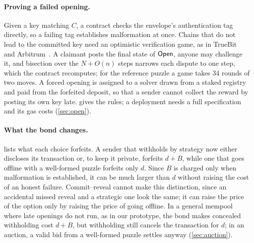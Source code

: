 \paragraph{Proving a failed opening.}
Given a key matching $C$, a contract checks the envelope's authentication tag directly, so a failing tag establishes malformation at once. Chains that do not lead to the committed key need an optimistic verification game, as in TrueBit~\cite{TR17} and Arbitrum~\cite{Arbitrum18}. A claimant posts the final state of $\mathsf{Open}$, anyone may challenge it, and bisection over the $N + O(n)$ steps narrows each dispute to one step, which the contract recomputes; for the reference puzzle a game takes 34 rounds of two moves. A forced opening is assigned to a solver drawn from a staked registry and paid from the forfeited deposit, so that a sender cannot collect the reward by posting its own key late.  gives the rules; a deployment needs a full specification and its gas costs (\cref{sec:open}).

\paragraph{What the bond changes.}
 lists what each choice forfeits. A sender that withholds by strategy now either discloses its transaction or, to keep it private, forfeits $d + B$, while one that goes offline with a well-formed puzzle forfeits only $d$. Since $B$ is charged only when malformation is established, it can be much larger than $d$ without raising the cost of an honest failure. Commit--reveal cannot make this distinction, since an accidental missed reveal and a strategic one look the same; it can raise the price of the option only by raising the price of going offline. In a general mempool where late openings do not run, as in our prototype, the bond makes concealed withholding cost $d + B$, but withholding still cancels the transaction for $d$; in an auction, a valid bid from a well-formed puzzle settles anyway (\cref{sec:auction}).

